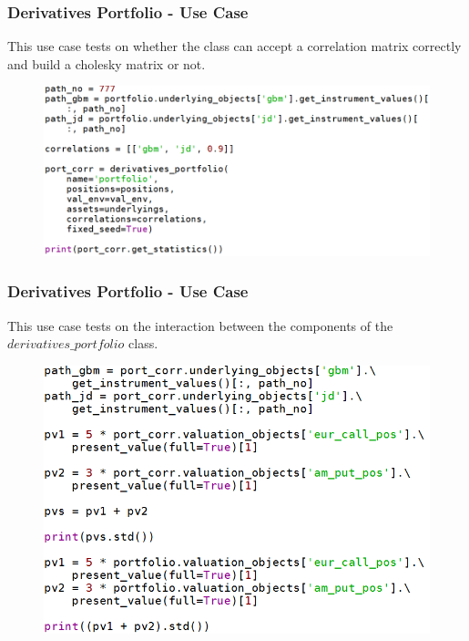 \documentclass{beamer}
\begin{document}
\begin{frame}
\frametitle{Derivatives Portfolio - Use Case}
This use case tests on whether the class can accept a correlation matrix correctly and build a cholesky matrix or not.
\begin{figure}[H]
	\includegraphics[scale=0.49]{derivatives_portfolio_use_case_2.png}
\end{figure}
\end{frame}

\begin{frame}
\frametitle{Derivatives Portfolio - Use Case}
This use case tests on the interaction between the components of the $derivatives\_portfolio$ class.
\begin{figure}[H]
	\includegraphics[scale=0.5]{derivatives_portfolio_use_case_3.png}
\end{figure}
\end{frame}
\end{document}
